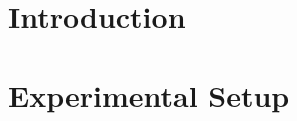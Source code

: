 \documentclass[fullpage]{uiucthesis2009}
\begin{document}
%
%
%
%
%
%
%

\mainmatter

\chapter{Introduction}

\chapter{Experimental Setup}
\label{sec:setup}

\end{document}
